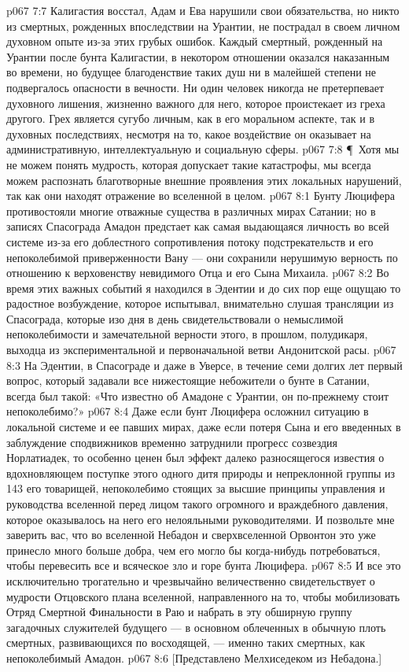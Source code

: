 \vs p067 7:7 Калигастия восстал, Адам и Ева нарушили свои обязательства, но никто из смертных, рожденных впоследствии на Урантии, не пострадал в своем личном духовном опыте из\hyp{}за этих грубых ошибок. Каждый смертный, рожденный на Урантии после бунта Калигастии, в некотором отношении оказался наказанным во времени, но будущее благоденствие таких душ ни в малейшей степени не подвергалось опасности в вечности. Ни один человек никогда не претерпевает духовного лишения, жизненно важного для него, которое проистекает из греха другого. Грех является сугубо личным, как в его моральном аспекте, так и в духовных последствиях, несмотря на то, какое воздействие он оказывает на административную, интеллектуальную и социальную сферы.
\vs p067 7:8 \P\ Хотя мы не можем понять мудрость, которая допускает такие катастрофы, мы всегда можем распознать благотворные внешние проявления этих локальных нарушений, так как они находят отражение во вселенной в целом.
\vs p067 8:1 Бунту Люцифера противостояли многие отважные существа в различных мирах Сатании; но в записях Спасограда Амадон предстает как самая выдающаяся личность во всей системе из\hyp{}за его доблестного сопротивления потоку подстрекательств и его непоколебимой приверженности Вану --- они сохранили нерушимую верность по отношению к верховенству невидимого Отца и его Сына Михаила.
\vs p067 8:2 Во время этих важных событий я находился в Эдентии и до сих пор еще ощущаю то радостное возбуждение, которое испытывал, внимательно слушая трансляции из Спасограда, которые изо дня в день свидетельствовали о немыслимой непоколебимости и замечательной верности этого, в прошлом, полудикаря, выходца из экспериментальной и первоначальной ветви Андонитской расы.
\vs p067 8:3 На Эдентии, в Спасограде и даже в Уверсе, в течение семи долгих лет первый вопрос, который задавали все нижестоящие небожители о бунте в Сатании, всегда был такой: «Что известно об Амадоне с Урантии, он по\hyp{}прежнему стоит непоколебимо?»
\vs p067 8:4 Даже если бунт Люцифера осложнил ситуацию в локальной системе и ее павших мирах, даже если потеря Сына и его введенных в заблуждение сподвижников временно затруднили прогресс созвездия Норлатиадек, то особенно ценен был эффект далеко разносящегося известия о вдохновляющем поступке этого одного дитя природы и непреклонной группы из 143 его товарищей, непоколебимо стоящих за высшие принципы управления и руководства вселенной перед лицом такого огромного и враждебного давления, которое оказывалось на него его нелояльными руководителями. И позвольте мне заверить вас, что во вселенной Небадон и сверхвселенной Орвонтон это уже принесло много больше добра, чем его могло бы когда\hyp{}нибудь потребоваться, чтобы перевесить все и всяческое зло и горе бунта Люцифера.
\vs p067 8:5 И все это исключительно трогательно и чрезвычайно величественно свидетельствует о мудрости Отцовского плана вселенной, направленного на то, чтобы мобилизовать Отряд Смертной Финальности в Раю и набрать в эту обширную группу загадочных служителей будущего --- в основном облеченных в обычную плоть смертных, развивающихся по восходящей, --- именно таких смертных, как непоколебимый Амадон.
\vs p067 8:6 [Представлено Мелхиседеком из Небадона.]
